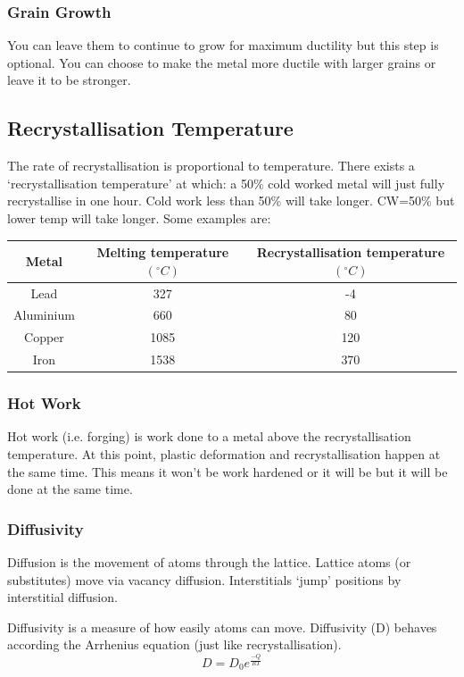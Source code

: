 \documentclass[12pt]{article}
\begin{document}
\subsubsection{Grain Growth}
You can leave them to continue to grow for maximum ductility but this step is optional. 
You can choose to make the metal more ductile with larger grains or leave it to be stronger.

\subsection{Recrystallisation Temperature}
The rate of recrystallisation is proportional to temperature. 
There exists a `recrystallisation temperature' at which: a 50\% cold worked metal will just fully recrystallise in one hour.
Cold work less than 50\% will take longer. CW=50\% but lower temp will take longer.
Some examples are:

\begin{tabular}{c|c|c}
  Metal & Melting temperature $(^\circ C)$ & Recrystallisation temperature $(^\circ C)$ \\
  \hline
  Lead & 327 & -4 \\
  Aluminium & 660 & 80 \\
  Copper & 1085 & 120 \\
  Iron & 1538 & 370 \\
\end{tabular}

\subsubsection{Hot Work}
Hot work (i.e. forging) is work done to a metal above the recrystallisation temperature.
At this point, plastic deformation and recrystallisation happen at the same time. 
This means it won't be work hardened or it will be but it will be done at the same time.

\subsubsection{Diffusivity}
Diffusion is the movement of atoms through the lattice.
Lattice atoms (or substitutes) move via vacancy diffusion.
Interstitials `jump' positions by interstitial diffusion.

Diffusivity is a measure of how easily atoms can move.
Diffusivity (D) behaves according the Arrhenius equation (just like recrystallisation).
\begin{equation*}
  D = D_0 e^{\frac{-Q}{RT}}
\end{equation*}
\end{document}
